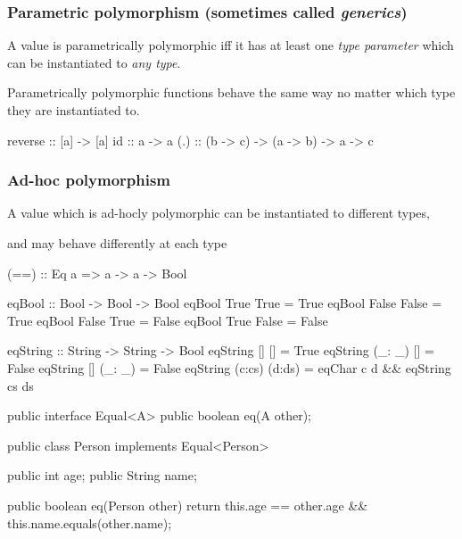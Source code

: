 \documentclass[usenames,dvipsnames,svgnames,table,aspectratio=169,mathserif]{beamer}
\newcommand{\nl}{\vspace{\baselineskip}}
\newcommand{\pnl}{\pause \nl}
\begin{document}
\begin{frame}[fragile]

\frametitle{Parametric polymorphism (sometimes called {\it generics})}

A value is parametrically polymorphic iff it has at least one {\it type parameter}
which can be instantiated to {\it any type}.

\nl

Parametrically polymorphic functions behave the same way no matter which type
they are instantiated to.

\pnl

\begin{haskellcode}
reverse :: [a] -> [a]
id :: a -> a
(.) :: (b -> c) -> (a -> b) -> a -> c
\end{haskellcode}

\end{frame}


\begin{frame}[fragile]
\frametitle{Ad-hoc polymorphism}

A value which is ad-hocly polymorphic can be instantiated to different types,

and may behave differently at each type

\end{frame}


\begin{frame}[fragile]

\begin{haskellcode}
(==) :: Eq a => a -> a -> Bool
\end{haskellcode}

\pnl

\begin{haskellcode}
eqBool :: Bool -> Bool -> Bool
eqBool True True   = True
eqBool False False = True
eqBool False True  = False
eqBool True False  = False
\end{haskellcode}

\pnl

\begin{haskellcode}
eqString :: String -> String -> Bool
eqString []      []     = True
eqString (_: _)  []     = False
eqString []      (_: _) = False
eqString (c:cs)  (d:ds) = eqChar c d && eqString cs ds
\end{haskellcode}

\end{frame}


\begin{frame}[fragile]
\begin{javacode}
public interface Equal<A> {
  public boolean eq(A other);
}
\end{javacode}

\pause

\begin{javacode}
public class Person implements Equal<Person> {
  public int age;
  public String name;

  public boolean eq(Person other) {
    return this.age == other.age && this.name.equals(other.name);
  }
}
\end{javacode}
\end{frame}
\end{document}
